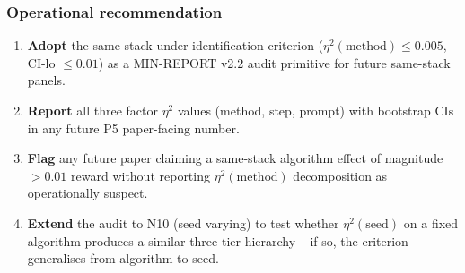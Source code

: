 \subsubsection{Operational recommendation}

\begin{enumerate}
\item \textbf{Adopt} the same-stack under-identification criterion
($\eta^2(\text{method}) \leq 0.005$, CI-lo $\leq 0.01$) as a MIN-REPORT
v2.2 audit primitive for future same-stack panels.
\item \textbf{Report} all three factor $\eta^2$ values (method, step,
prompt) with bootstrap CIs in any future P5 paper-facing number.
\item \textbf{Flag} any future paper claiming a same-stack algorithm effect
of magnitude $> 0.01$ reward without reporting $\eta^2(\text{method})$
decomposition as operationally suspect.
\item \textbf{Extend} the audit to N10 (seed varying) to test whether
$\eta^2(\text{seed})$ on a fixed algorithm produces a similar three-tier
hierarchy -- if so, the criterion generalises from algorithm to seed.
\end{enumerate}